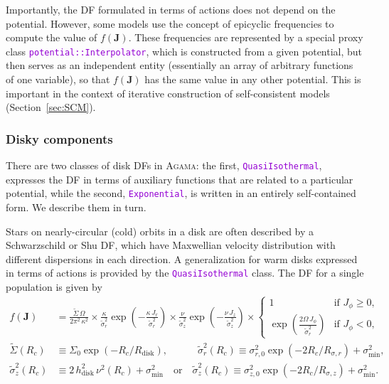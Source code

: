 \documentclass[12pt]{article}
\newcommand{\Agama}{\textsc{Agama}\xspace}
\newcommand{\ttt}[1]{\textcolor{darkviolet}{\texttt{#1}}}
\newcommand{\bJ}{\boldsymbol{J}}
\begin{document}
Importantly, the DF formulated in terms of actions does not depend on the potential. However, some models use the concept of epicyclic frequencies to compute the value of $f(\bJ)$. These frequencies are represented by a special proxy class \ttt{potential::Interpolator}, which is constructed from a given potential, but then serves as an independent entity (essentially an array of arbitrary functions of one variable), so that $f(\bJ)$ has the same value in any other potential. This is important in the context of iterative construction of self-consistent models (Section~\ref{sec:SCM}).

\subsubsection{Disky components}  \label{sec:DFdisk}

There are two classes of disk DFs in \Agama: the first, \ttt{QuasiIsothermal}, expresses the DF in terms of auxiliary functions that are related to a particular potential, while the second, \ttt{Exponential}, is written in an entirely self-contained form. We describe them in turn.

Stars on nearly-circular (cold) orbits in a disk are often described by a Schwarzschild or Shu DF, which have Maxwellian velocity distribution with different dispersions in each direction. A generalization for warm disks \cite{Dehnen1999} expressed in terms of actions \cite{BinneyMcMillan2011} is provided by the \ttt{QuasiIsothermal} class. The DF for a single population is given by
\begin{align*}
f(\bJ) &= \frac{\tilde\Sigma\,\Omega}{2\pi^2\,\kappa^2} \times
\frac{\kappa}{\tilde\sigma_r^2} \exp\left(-\frac{\kappa\,J_r}{\tilde\sigma_r^2}\right) \times
\frac{\nu}   {\tilde\sigma_z^2} \exp\left(-\frac{\nu\,   J_z}{\tilde\sigma_z^2}\right) \times
\left\{ \begin{array}{ll}  1 & \mbox{if }J_\phi\ge 0, \\
\exp\left( \frac{2\Omega\,J_\phi}{\tilde\sigma_r^2} \right) & \mbox{if }J_\phi<0, \end{array} \right. \\
\tilde\Sigma(R_c)  &\equiv \Sigma_0 \exp( -R_c / R_\mathrm{disk} ) , \qquad\quad
\tilde\sigma_r^2(R_c) \equiv \sigma_{r,0}^2 \exp( -2R_c / R_{\sigma,r} ) + \sigma_\mathrm{min}^2,\\
\tilde\sigma_z^2(R_c)&\equiv 2\,h_\mathrm{disk}^2\,\nu^2(R_c)  + \sigma_\mathrm{min}^2
\quad\mbox{or}\quad
\tilde\sigma_z^2(R_c) \equiv \sigma_{z,0}^2 \exp( -2R_c / R_{\sigma,z} )  + \sigma_\mathrm{min}^2.
\end{align*}
\end{document}
